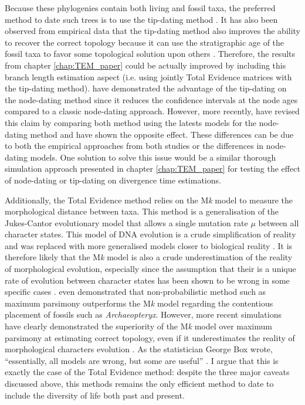 Because these phylogenies contain both living and fossil taxa, the preferred method to date such trees is to use the tip-dating method \citep[e.g.][]{ronquista2012,Wood01032013,Dembo2015}.
It has also been observed from empirical data that the tip-dating method also improves the ability to recover the correct topology because it can use the stratigraphic age of the fossil taxa to favor some topological solution upon others \citep[typically by minimizing implied ghost lineages;][and personal communications]{BEASTmaster}.
Therefore, the results from chapter \ref{chap:TEM_paper} could be actually improved by including this branch length estimation aspect (i.e. using jointly Total Evidence matrices with the tip-dating method).
\cite{ronquista2012} have demonstrated the advantage of the tip-dating on the node-dating method since it reduces the confidence intervals at the node ages compared to a classic node-dating approach.
However, more recently, \cite{Arcila2015131} have revised this claim by comparing both method using the latests models for the node-dating method \citep[i.e. using the fossilised birth-death model;][]{heaththe2013} and have shown the opposite effect.
These differences can be due to both the empirical approaches from both studies or the differences in node-dating models.
One solution to solve this issue would be a similar thorough simulation approach presented in chapter \ref{chap:TEM_paper} for testing the effect of node-dating or tip-dating on divergence time estimations.

Additionally, the Total Evidence method relies on the M\textit{k} model \citep{lewisa2001} to measure the morphological distance between taxa.
This method is a generalisation of the Jukes-Cantor evolutionary model \citep{jukes1969evolution} that allows a single mutation rate $\mu$ between all character states.
This model of DNA evolution is a crude simplification of reality and was replaced with more generalised models closer to biological reality \citep[e.g. the GTR model allowing a different rate for each mutation;][]{tavare1986}.
It is therefore likely that the M\textit{k} model is also a crude underestimation of the reality of morphological evolution, especially since the assumption that their is a unique rate of evolution between character states has been shown to be wrong in some specific cases \citep[e.g. for Dollo traits;][]{WrightDollo}.
\cite{spencerefficacy2013} even demonstrated that non-probabilistic method such as maximum parsimony outperforms the M\textit{k} model regarding the contentious placement of fossils such as \textit{Archaeopteryx}.
However, more recent simulations have clearly demonstrated the superiority of the M\textit{k} model over maximum parsimony at estimating correct topology, even if it underestimates the reality of morphological characters evolution \citep{wrightbayesian2014}.
As the statistician George Box wrote, ``essentially, all models are wrong, but some are useful'' \citep{box1987empirical}.
I argue that this is exactly the case of the Total Evidence method: despite the three major caveats discussed above, this methods remains the only efficient method to date to include the diversity of life both past and present.

